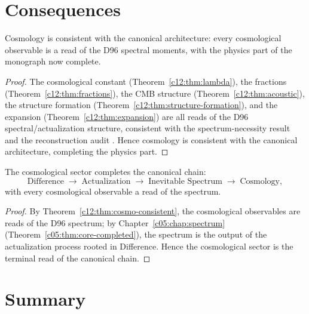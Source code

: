 \section{Consequences}
\label{c12:sec:cosmo-consequences}

\begin{theorem}
\label{c12:thm:cosmo-consistent}
Cosmology is consistent with the canonical architecture: every cosmological observable is
a read of the D96 spectral moments, with the physics part of the monograph now complete.
\end{theorem}

\begin{proof}
The cosmological constant (Theorem~\ref{c12:thm:lambda}), the fractions
(Theorem~\ref{c12:thm:fractions}), the CMB structure (Theorem~\ref{c12:thm:acoustic}), the structure
formation (Theorem~\ref{c12:thm:structure-formation}), and the expansion
(Theorem~\ref{c12:thm:expansion}) are all reads of the D96 spectral/actualization structure,
consistent with the spectrum-necessity result \cite{c12:QG295} and the reconstruction audit
\cite{c12:QG296}. Hence cosmology is consistent with the canonical architecture, completing the
physics part.
\end{proof}

\begin{corollary}
\label{c12:cor:canonical-cosmology}
The cosmological sector completes the canonical chain:
\[
\text{Difference}\;\longrightarrow\;\text{Actualization}\;\longrightarrow\;\text{Inevitable Spectrum}\;\longrightarrow\;\text{Cosmology},
\]
with every cosmological observable a read of the spectrum.
\end{corollary}

\begin{proof}
By Theorem~\ref{c12:thm:cosmo-consistent}, the cosmological observables are reads of the D96
spectrum; by Chapter~\ref{c05:chap:spectrum} (Theorem~\ref{c05:thm:core-completed}), the spectrum
is the output of the actualization process rooted in Difference. Hence the cosmological
sector is the terminal read of the canonical chain.
\end{proof}

\section{Summary}
\label{c12:sec:cosmo-summary}

